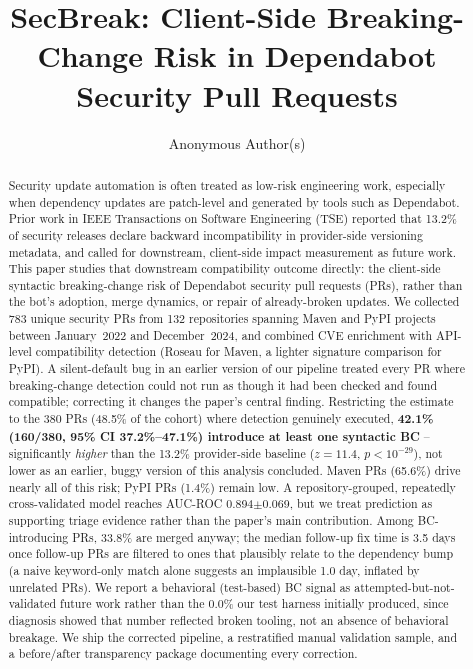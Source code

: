 \documentclass[10pt,journal]{IEEEtran}
\title{SecBreak: Client-Side Breaking-Change Risk in Dependabot Security Pull Requests}
\author{Anonymous Author(s)}
\begin{document}
\maketitle

\begin{abstract}
Security update automation is often treated as low-risk engineering work, especially when dependency updates are patch-level and generated by tools such as Dependabot. Prior work in IEEE Transactions on Software Engineering (TSE) reported that 13.2\% of security releases declare backward incompatibility in provider-side versioning metadata, and called for downstream, client-side impact measurement as future work. This paper studies that downstream compatibility outcome directly: the client-side syntactic breaking-change risk of Dependabot security pull requests (PRs), rather than the bot's adoption, merge dynamics, or repair of already-broken updates. We collected 783 unique security PRs from 132 repositories spanning Maven and PyPI projects between January~2022 and December~2024, and combined CVE enrichment with API-level compatibility detection (Roseau for Maven, a lighter signature comparison for PyPI). A silent-default bug in an earlier version of our pipeline treated every PR where breaking-change detection could not run as though it had been checked and found compatible; correcting it changes the paper's central finding. Restricting the estimate to the 380 PRs (48.5\% of the cohort) where detection genuinely executed, \textbf{42.1\% (160/380, 95\% CI 37.2\%--47.1\%) introduce at least one syntactic BC} -- significantly \emph{higher} than the 13.2\% provider-side baseline ($z=11.4$, $p<10^{-29}$), not lower as an earlier, buggy version of this analysis concluded. Maven PRs (65.6\%) drive nearly all of this risk; PyPI PRs (1.4\%) remain low. A repository-grouped, repeatedly cross-validated model reaches AUC-ROC 0.894$\pm$0.069, but we treat prediction as supporting triage evidence rather than the paper's main contribution. Among BC-introducing PRs, 33.8\% are merged anyway; the median follow-up fix time is 3.5 days once follow-up PRs are filtered to ones that plausibly relate to the dependency bump (a naive keyword-only match alone suggests an implausible 1.0 day, inflated by unrelated PRs). We report a behavioral (test-based) BC signal as attempted-but-not-validated future work rather than the 0.0\% our test harness initially produced, since diagnosis showed that number reflected broken tooling, not an absence of behavioral breakage. We ship the corrected pipeline, a restratified manual validation sample, and a before/after transparency package documenting every correction.
\end{abstract}
\end{document}
